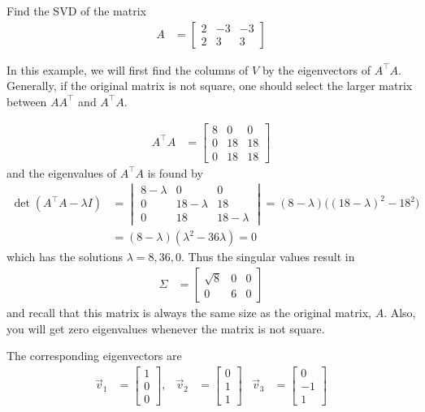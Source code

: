 \begin{example}
Find the SVD of the matrix
\begin{align*}
A & = \begin{bmatrix}
2 & -3 & -3 \\
2 & 3 & 3 
\end{bmatrix}
\end{align*}

\solution

In this example, we will first find the columns of $V$ by the eigenvectors of $A^{\intercal}A$.  Generally, if the original matrix is not square, one should select the larger matrix between $AA^{\intercal}$ and $A^{\intercal}A$. 

\begin{align*}
A^{\intercal}A & = \begin{bmatrix}
8 & 0 & 0 \\ 
0 & 18 & 18 \\
0 & 18 & 18 
\end{bmatrix}
\end{align*}
and the eigenvalues of $A^{\intercal}A$ is found by 
\begin{align*}
\det(A^{\intercal}A-\lambda I) & = \begin{vmatrix}
8-\lambda & 0 & 0 \\ 
0 & 18-\lambda & 18 \\
0 & 18 & 18-\lambda 
\end{vmatrix} = (8-\lambda)\bigl((18-\lambda)^2-18^2\bigr) \\
& = (8-\lambda)(\lambda^2-36\lambda) = 0 
\end{align*}
which has the solutions $\lambda=8,36,0$.   Thus the singular values result in
\begin{align*}
\Sigma & = \begin{bmatrix}
\sqrt{8} & 0 & 0 \\
0 & 6 & 0 
\end{bmatrix}
\end{align*}
and recall that this matrix is always the same size as the original matrix, $A$.  Also, you will get zero eigenvalues whenever the matrix is not square.  

The corresponding eigenvectors are 
\begin{align*}
\vec{v}_1 & = \begin{bmatrix}
1 \\ 0 \\ 0
\end{bmatrix}, & \vec{v}_2 & = \begin{bmatrix}
0 \\ 1 \\1
\end{bmatrix} & \vec{v}_3 & = \begin{bmatrix}
0 \\ -1 \\ 1 
\end{bmatrix}
\end{align*}


\end{example}
